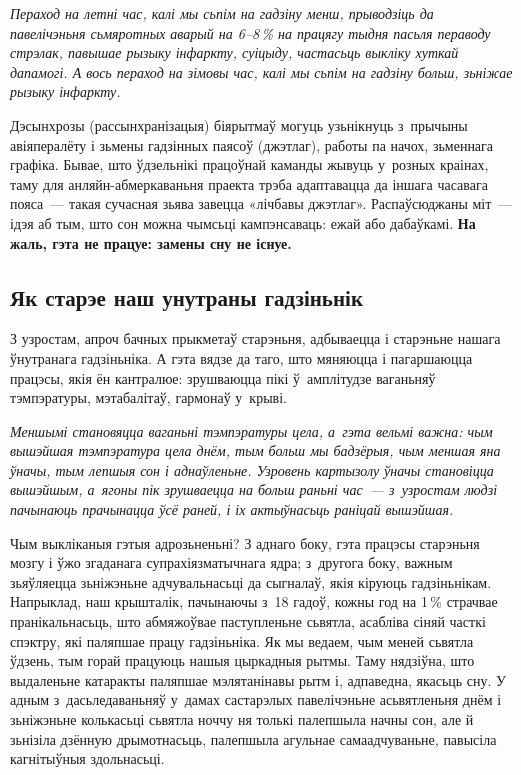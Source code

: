 \emph{Пераход на летні час, калі мы сьпім на гадзіну менш, прыводзіць да павелічэньня сьмяротных аварый на 6--8\,\% на працягу тыдня пасьля пераводу стрэлак, павышае рызыку інфаркту, суіцыду, частасьць выкліку хуткай дапамогі. А вось пераход на зімовы час, калі мы сьпім на гадзіну больш, зьніжае рызыку інфаркту.}

Дэсынхрозы (рассынхранізацыя) біярытмаў могуць узьнікнуць з~прычыны авіяпералёту і зьмены гадзінных паясоў (джэтлаг), работы па начох, зьменнага графіка. Бывае, што ўдзельнікі працоўнай каманды жывуць у~розных краінах, таму для анляйн-абмеркаваньня праекта трэба адаптавацца да іншага часавага пояса~--- такая сучасная зьява завецца «лічбавы джэтлаг». Распаўсюджаны міт~--- ідэя аб тым, што сон можна чымсьці кампэнсаваць: ежай або дабаўкамі. \textbf{На жаль, гэта не працуе: замены сну не існуе.}

\subsection*{Як старэе наш унутраны гадзіньнік}

З узростам, апроч бачных прыкметаў старэньня, адбываецца і старэньне нашага ўнутранага гадзіньніка. А гэта вядзе да таго, што мяняюцца і пагаршаюцца працэсы, якія ён кантралюе: зрушваюцца пікі ў~амплітудзе ваганьняў тэмпэратуры, мэтабалітаў, гармонаў у~крыві.

\emph{Меншымі становяцца ваганьні тэмпэратуры цела, а~гэта вельмі важна: чым вышэйшая тэмпэратура цела днём, тым больш мы бадзёрыя, чым меншая яна ўначы, тым лепшыя сон і аднаўленьне. Узровень картызолу ўначы становіцца вышэйшым, а~ягоны пік зрушваецца на больш раньні час~--- з~узростам людзі пачынаюць прачынацца ўсё раней, і іх актыўнасьць раніцай вышэйшая.}

Чым выкліканыя гэтыя адрозьненьні? З аднаго боку, гэта працэсы старэньня мозгу і ўжо згаданага супрахіязматычнага ядра; з~другога боку, важным зьяўляецца зьніжэньне адчувальнасьці да сыгналаў, якія кіруюць гадзіньнікам. Напрыклад, наш крышталік, пачынаючы з~18 гадоў, кожны год на 1\,\% страчвае пранікальнасьць, што абмяжоўвае паступленьне сьвятла, асабліва сіняй часткі спэктру, які паляпшае працу гадзіньніка. Як мы ведаем, чым меней сьвятла ўдзень, тым горай працуюць нашыя цыркадныя рытмы. Таму нядзіўна, што выдаленьне катаракты паляпшае мэлятанінавы рытм і, адпаведна, якасьць сну. У адным з~дасьледаваньняў у~дамах састарэлых павелічэньне асьвятленьня днём і зьніжэньне колькасьці сьвятла ноччу ня толькі палепшыла начны сон, але й зьнізіла дзённую дрымотнасьць, палепшыла агульнае самаадчуваньне, павысіла кагнітыўныя здольнасьці.

